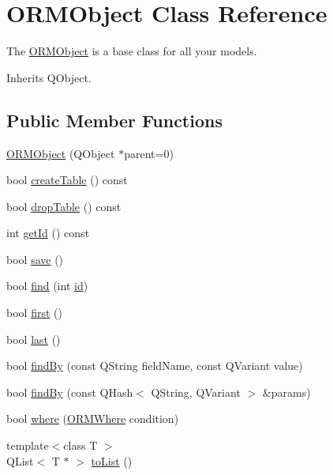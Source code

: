 \hypertarget{class_o_r_m_object}{\section{O\-R\-M\-Object Class Reference}
\label{class_o_r_m_object}
}


The \hyperlink{class_o_r_m_object}{O\-R\-M\-Object} is a base class for all your models.  




Inherits Q\-Object.

\subsection*{Public Member Functions}
\begin{DoxyCompactItemize}
\item 
\hyperlink{class_o_r_m_object_ac6fe34862a531c6e8997e192efa2b58e}{O\-R\-M\-Object} (Q\-Object $\ast$parent=0)
\item 
bool \hyperlink{class_o_r_m_object_aa4b3afcaa5bbd9378d475f2731b2f0ba}{create\-Table} () const 
\item 
bool \hyperlink{class_o_r_m_object_a53dc0b7cd89670e3fb41b7744723be5e}{drop\-Table} () const 
\item 
int \hyperlink{class_o_r_m_object_a91c4f17ab400515dcfb1621cf3de9937}{get\-Id} () const 
\item 
bool \hyperlink{class_o_r_m_object_a9593290b073c8023affc8e54e1c6ac55}{save} ()
\item 
bool \hyperlink{class_o_r_m_object_a0995c54ac3b6c06ea76585a2493773b7}{find} (int \hyperlink{class_o_r_m_object_a8dd7d23f7d0ccc13b2595ef534cc6826}{id})
\item 
bool \hyperlink{class_o_r_m_object_a5a7c8628800a40c764c7b168d4d0e86e}{first} ()
\item 
bool \hyperlink{class_o_r_m_object_add021ba2ee2590e7957a6c277ecdf63d}{last} ()
\item 
bool \hyperlink{class_o_r_m_object_a742c5f0cfe74eec4ae7fd5af5212fed0}{find\-By} (const Q\-String field\-Name, const Q\-Variant value)
\item 
bool \hyperlink{class_o_r_m_object_a26c85f99297f39a92cb20196e9af6d54}{find\-By} (const Q\-Hash$<$ Q\-String, Q\-Variant $>$ \&params)
\item 
bool \hyperlink{class_o_r_m_object_a11ff9723e7f82c496df41bf4d099dcdb}{where} (\hyperlink{class_o_r_m_where}{O\-R\-M\-Where} condition)
\item 
{\footnotesize template$<$class T $>$ }\\Q\-List$<$ T $\ast$ $>$ \hyperlink{class_o_r_m_object_a6d85bdb41db98bd2cd522c1559ce45ff}{to\-List} ()
\end{DoxyCompactItemize}
